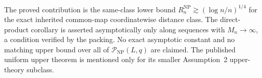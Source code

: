 The proved contribution is the same-class lower bound \(R_n^{\mathrm{NP}}\gtrsim(\log n/n)^{1/4}\) for the exact inherited common-map coordinatewise distance class.  The direct-product corollary is asserted asymptotically only along sequences with \(M_n\to\infty\), a condition verified by the packing.  No exact asymptotic constant and no matching upper bound over all of \(\mathcal P_{\mathrm{NP}}(L,q)\) are claimed.  The published uniform upper theorem is mentioned only for its smaller Assumption~2 upper-theory subclass.